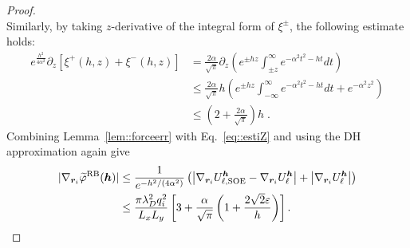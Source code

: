 \begin{proof}
\begin{equation}
	\end{equation}
	Similarly, by taking $z$-derivative of the integral form of $\xi^{\pm}$, the following estimate holds:
	\begin{equation}\label{eq::estiZ}
		\begin{split}
			e^{\frac{h^2}{4 \alpha^2}} \partial_z \left[\xi^{+} (h, z)+\xi^{-} (h, z)\right] & = \frac{2\alpha}{\sqrt{\pi}} \partial_z \left( e^{\pm h z} \int_{\pm z}^{\infty} e^{-\alpha^2 t^2 - ht} dt \right) \\
			& \leq \frac{2\alpha}{\sqrt{\pi}} h \left( e^{\pm h z} \int_{- \infty}^{\infty} e^{-\alpha^2 t^2 - ht} dt + e^{-\alpha^2 z^2} \right) \\
			& \leq \left(2 + \frac{2\alpha}{\sqrt{\pi}} \right) h\;.
		\end{split}
	\end{equation}
	Combining Lemma~\ref{lem::forceerr} with Eq.~\eqref{eq::estiZ} and using the DH approximation again give
	\begin{equation}
		\begin{split}
			\lvert \nabla_{\bm{r}_i}\widetilde{\varphi}^{\text{RB}}(\bm{h})\rvert&\leq \frac{1}{e^{-h^2/(4\alpha^2)}}\left(\left|\nabla_{\bm{r}_i}U_{\ell,\text{SOE}}^{\bm{h}}-\nabla_{\bm{r}_i}U_{\ell}^{\bm{h}}\right|+\left|\nabla_{\bm{r}_i}U_{\ell}^{\bm{h}}\right|\right)\\
			&\leq \frac{\pi \lambda_D^2 q_{i}^2}{L_xL_y}\left[3+\frac{\alpha}{\sqrt{\pi}}\left(1+\frac{2\sqrt{2}\varepsilon}{h}\right)\right].
		\end{split}
	\end{equation}
\end{proof}

